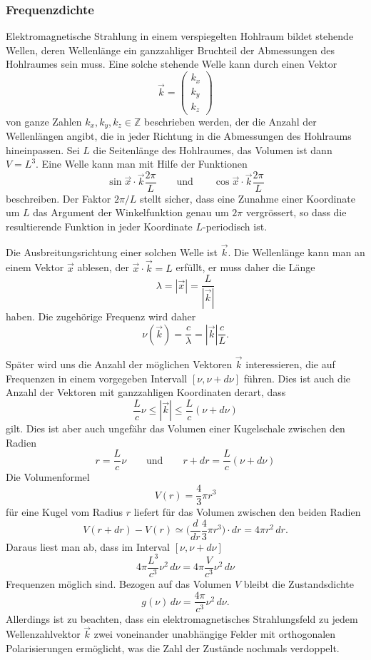 \subsubsection{Frequenzdichte}
Elektromagnetische Strahlung in einem verspiegelten Hohlraum bildet
stehende Wellen,
deren Wellenlänge ein ganzzahliger Bruchteil der Abmessungen des
Hohlraumes sein muss.
Eine solche stehende Welle kann durch einen Vektor
\[
\vec{k} = \begin{pmatrix}k_x\\k_y\\k_z\end{pmatrix}
\]
von ganze Zahlen $k_x,k_y,k_z\in\mathbb Z$ beschrieben werden, der
die Anzahl der Wellenlängen angibt, die in jeder Richtung in die
Abmessungen des Hohlraums hineinpassen.
Sei $L$ die Seitenlänge des Hohlraumes, das Volumen ist dann $V=L^3$.
Eine Welle kann man mit Hilfe der Funktionen
\[
\sin \vec{x}\cdot\vec{k}\frac{2\pi}{L}
\qquad\text{und}\qquad
\cos \vec{x}\cdot\vec{k}\frac{2\pi}{L}
\]
beschreiben.
Der Faktor $2\pi/L$ stellt sicher, dass eine Zunahme einer Koordinate
um $L$ das Argument der Winkelfunktion genau um $2\pi$ vergrössert,
so dass die resultierende Funktion in jeder Koordinate $L$-periodisch ist.

Die Ausbreitungsrichtung einer solchen Welle ist $\vec{k}$.
Die Wellenlänge kann man an einem Vektor $\vec{x}$ ablesen, der
$\vec{x}\cdot\vec{k}=L$ erfüllt, er muss daher die Länge
\[
\lambda
=
|\vec{x}|
=
\frac{L}{|\vec{k}|}
\]
haben.
Die zugehörige Frequenz wird daher
\[
\nu(\vec{k})
=
\frac{c}{\lambda}=|\vec{k}|\frac{c}{L}.
\]

Später wird uns die Anzahl der möglichen Vektoren $\vec{k}$ interessieren,
die auf Frequenzen in einem vorgegeben Intervall $[\nu, \nu+d\nu]$
führen.
Dies ist auch die Anzahl der Vektoren mit ganzzahligen Koordinaten derart,
dass
\[
\frac{L}{c}\nu
\le
|\vec{k}|
\le
\frac{L}{c}(\nu+d\nu)
\]
gilt.
Dies ist aber auch ungefähr das Volumen einer Kugelschale zwischen den
Radien 
\[
r=\frac{L}{c}\nu
\qquad\text{und}\qquad
r+dr=\frac{L}{c}(\nu+d\nu)
\]
Die Volumenformel
\[
V(r)
=
\frac{4}{3}\pi r^3
\]
für eine Kugel vom Radius $r$ liefert für das Volumen
zwischen den beiden Radien
\[
V(r+dr)-V(r)
\simeq
\biggl(\frac{d}{dr} \frac{4}{3}\pi  r^3\biggr) \cdot dr
=
4\pi r^2\,dr.
\]
Daraus liest man ab, dass im Interval $[\nu,\nu+d\nu]$ 
\[
4\pi \frac{L^3}{c^3}\nu^2\,d\nu
=
4\pi \frac{V}{c^3}\nu^2\,d\nu
\]
Frequenzen möglich sind.
Bezogen auf das Volumen $V$ bleibt die Zustandsdichte
\begin{equation}
g(\nu)\,d\nu = \frac{4\pi}{c^3}\nu^2\,d\nu.
\label{skript:cmb:zustandsdichte}
\end{equation}
Allerdings ist zu beachten, dass ein elektromagnetisches Strahlungsfeld
zu jedem Wellenzahlvektor $\vec{k}$ zwei voneinander unabhängige 
Felder mit orthogonalen Polarisierungen ermöglicht, was die Zahl
der Zustände nochmals verdoppelt.

